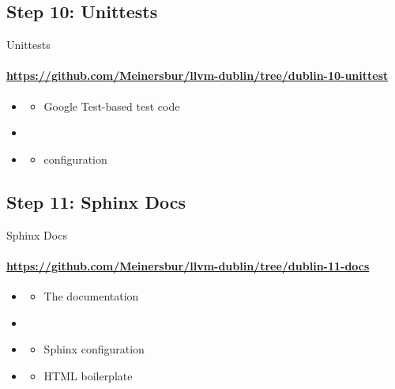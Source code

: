 \subsection{Step 10: Unittests}
\begin{frame}[fragile]{Unittests}
\framesubtitle{\url{https://github.com/Meinersbur/llvm-dublin/tree/dublin-10-unittest}}
\begin{itemize}
\item[\pgfuseimage{file}] 
    \begin{itemize}
    \item Google Test-based test code
    \end{itemize}
\item[\pgfuseimage{file}] 
\item[\pgfuseimage{file}] 
    \begin{itemize}
    \item {} configuration
    \end{itemize}
\end{itemize}
\end{frame}



\subsection{Step 11: Sphinx Docs}
\begin{frame}[fragile]{Sphinx Docs}
\framesubtitle{\url{https://github.com/Meinersbur/llvm-dublin/tree/dublin-11-docs}}
\begin{itemize}
\item[\pgfuseimage{file}] 
    \begin{itemize}
    \item The documentation
    \end{itemize}
\item[\pgfuseimage{file}] 
\item[\pgfuseimage{file}] 
    \begin{itemize}
    \item Sphinx configuration
    \end{itemize}
\item[\pgfuseimage{dir}] 
    \begin{itemize}
    \item HTML boilerplate
    \end{itemize}
\end{itemize}
\end{frame}




